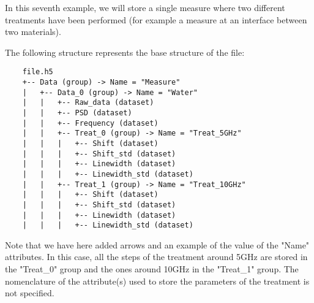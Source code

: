 In this seventh example, we will store a single measure where two different treatments have been performed (for example a measure at an interface between two materials).

The following structure represents the base structure of the file:
\begin{verbatim}
    file.h5
    +-- Data (group) -> Name = "Measure"
    |   +-- Data_0 (group) -> Name = "Water"
    |   |   +-- Raw_data (dataset)
    |   |   +-- PSD (dataset)
    |   |   +-- Frequency (dataset)
    |   |   +-- Treat_0 (group) -> Name = "Treat_5GHz"
    |   |   |   +-- Shift (dataset)
    |   |   |   +-- Shift_std (dataset)
    |   |   |   +-- Linewidth (dataset)
    |   |   |   +-- Linewidth_std (dataset)
    |   |   +-- Treat_1 (group) -> Name = "Treat_10GHz"
    |   |   |   +-- Shift (dataset)
    |   |   |   +-- Shift_std (dataset)
    |   |   |   +-- Linewidth (dataset)
    |   |   |   +-- Linewidth_std (dataset)
\end{verbatim}
Note that we have here added arrows and an example of the value of the "Name" attributes.
In this case, all the steps of the treatment around 5GHz are stored in the "Treat\_0" group and the ones around 10GHz in the "Treat\_1" group. The nomenclature of the attribute(s) used to store the parameters of the treatment is not specified.